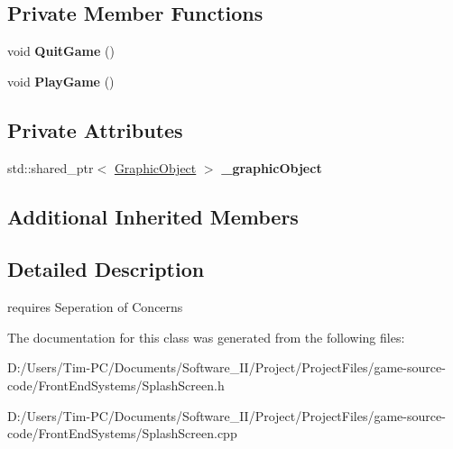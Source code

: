 \subsection*{Private Member Functions}
\begin{DoxyCompactItemize}
\item 
\mbox{\label{class_splash_screen_a5d9ac6cec631b24cc947dda245e7d151}} 
void {\bfseries Quit\+Game} ()
\item 
\mbox{\label{class_splash_screen_a008328b85475bd01e326f94f20bf9217}} 
void {\bfseries Play\+Game} ()
\end{DoxyCompactItemize}
\subsection*{Private Attributes}
\begin{DoxyCompactItemize}
\item 
\mbox{\label{class_splash_screen_a02280054f7b1e6cce017d7c12c175d76}} 
std\+::shared\+\_\+ptr$<$ \hyperlink{class_graphic_object}{Graphic\+Object} $>$ {\bfseries \+\_\+graphic\+Object}
\end{DoxyCompactItemize}
\subsection*{Additional Inherited Members}


\subsection{Detailed Description}
requires Seperation of Concerns 

The documentation for this class was generated from the following files\+:\begin{DoxyCompactItemize}
\item 
D\+:/\+Users/\+Tim-\/\+P\+C/\+Documents/\+Software\+\_\+\+I\+I/\+Project/\+Project\+Files/game-\/source-\/code/\+Front\+End\+Systems/Splash\+Screen.\+h\item 
D\+:/\+Users/\+Tim-\/\+P\+C/\+Documents/\+Software\+\_\+\+I\+I/\+Project/\+Project\+Files/game-\/source-\/code/\+Front\+End\+Systems/Splash\+Screen.\+cpp\end{DoxyCompactItemize}
